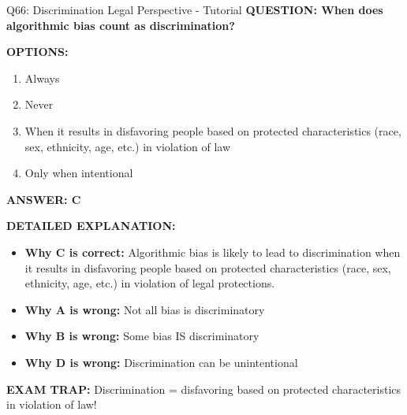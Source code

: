 \documentclass[8pt]{beamer}
\begin{document}
	\begin{frame}{Q66: Discrimination Legal Perspective - Tutorial}
		\fontsize{6.5}{7.5}\selectfont
		\textbf{QUESTION: When does algorithmic bias count as discrimination?}
		
		\vspace{0.1cm}
		\textbf{OPTIONS:}
		\begin{enumerate}
			\item Always
			\item Never
			\item When it results in disfavoring people based on protected characteristics (race, sex, ethnicity, age, etc.) in violation of law
			\item Only when intentional
		\end{enumerate}
		
		\vspace{0.1cm}
		\textcolor{myblue}{\textbf{ANSWER: C}}
		
		\vspace{0.1cm}
		\textbf{DETAILED EXPLANATION:}
		\begin{itemize}
			\item \textbf{Why C is correct:} Algorithmic bias is likely to lead to discrimination when it results in disfavoring people based on protected characteristics (race, sex, ethnicity, age, etc.) in violation of legal protections.
			\item \textbf{Why A is wrong:} Not all bias is discriminatory
			\item \textbf{Why B is wrong:} Some bias IS discriminatory
			\item \textbf{Why D is wrong:} Discrimination can be unintentional
		\end{itemize}
		
		\textcolor{myred}{\textbf{EXAM TRAP:}} Discrimination = \textcolor{myblue}{disfavoring based on protected characteristics} in violation of law!
	\end{frame}
	
\end{document}

